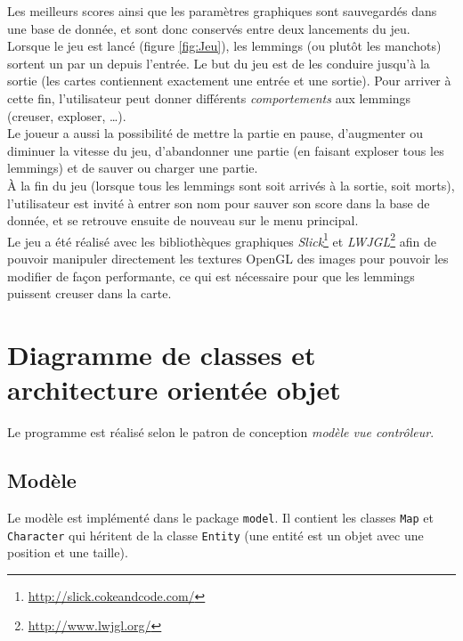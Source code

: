 \documentclass[a4paper,12pt]{article}
\begin{document}
Les meilleurs scores ainsi que les paramètres graphiques sont sauvegardés
dans une base de donnée, et sont donc conservés entre deux lancements du
jeu.\\

Lorsque le jeu est lancé (figure \ref{fig:Jeu}), les lemmings (ou
plutôt les manchots) sortent un par un depuis l'entrée. Le but du jeu est
de les conduire jusqu'à la sortie (les cartes contiennent exactement
une entrée et une sortie). Pour arriver à cette fin, l'utilisateur
peut donner différents \emph{comportements} aux lemmings (creuser,
exploser, \dots).\\

Le joueur a aussi la possibilité de mettre la partie en pause,
d'augmenter ou diminuer la vitesse du jeu, d'abandonner une partie (en
faisant exploser tous les lemmings) et de sauver ou charger une
partie.\\

À la fin du jeu (lorsque tous les lemmings sont soit arrivés à la
sortie, soit morts), l'utilisateur est invité à entrer son nom pour
sauver son score dans la base de donnée, et se retrouve ensuite de
nouveau sur le menu principal.\\

Le jeu a été réalisé avec les bibliothèques graphiques
\emph{Slick}\footnote{\url{http://slick.cokeandcode.com/}} et
\emph{LWJGL}\footnote{\url{http://www.lwjgl.org/}} afin de pouvoir
manipuler directement les textures OpenGL des images pour pouvoir les
modifier de façon performante, ce qui est nécessaire pour que les
lemmings puissent creuser dans la carte.

\section{Diagramme de classes et architecture orientée objet}
Le programme est réalisé selon le patron de conception \emph{modèle
  vue contrôleur}.

\subsection{Modèle\label{sec:model}}
Le modèle est implémenté dans le package \texttt{model}. Il contient
les classes \texttt{Map} et \texttt{Character} qui héritent de la
classe \texttt{Entity} (une entité est un objet avec une position et
une taille).
\end{document}
